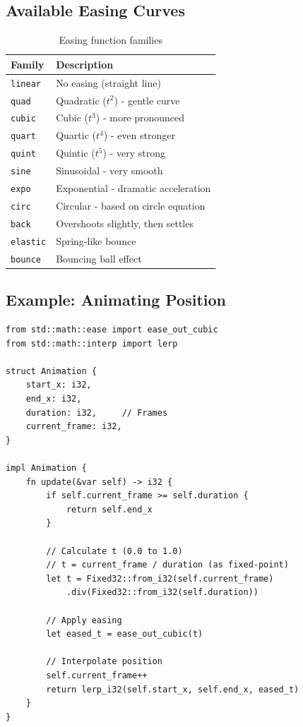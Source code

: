 \subsection{Available Easing Curves}

\begin{table}[h]
\centering
\begin{tabular}{lp{8cm}}
\textbf{Family} & \textbf{Description} \\
\hline
\texttt{linear} & No easing (straight line) \\
\texttt{quad} & Quadratic ($t^2$) - gentle curve \\
\texttt{cubic} & Cubic ($t^3$) - more pronounced \\
\texttt{quart} & Quartic ($t^4$) - even stronger \\
\texttt{quint} & Quintic ($t^5$) - very strong \\
\texttt{sine} & Sinusoidal - very smooth \\
\texttt{expo} & Exponential - dramatic acceleration \\
\texttt{circ} & Circular - based on circle equation \\
\texttt{back} & Overshoots slightly, then settles \\
\texttt{elastic} & Spring-like bounce \\
\texttt{bounce} & Bouncing ball effect \\
\end{tabular}
\caption{Easing function families}
\end{table}

\subsection{Example: Animating Position}

\begin{lstlisting}
from std::math::ease import ease_out_cubic
from std::math::interp import lerp

struct Animation {
    start_x: i32,
    end_x: i32,
    duration: i32,     // Frames
    current_frame: i32,
}

impl Animation {
    fn update(&var self) -> i32 {
        if self.current_frame >= self.duration {
            return self.end_x
        }

        // Calculate t (0.0 to 1.0)
        // t = current_frame / duration (as fixed-point)
        let t = Fixed32::from_i32(self.current_frame)
            .div(Fixed32::from_i32(self.duration))

        // Apply easing
        let eased_t = ease_out_cubic(t)

        // Interpolate position
        self.current_frame++
        return lerp_i32(self.start_x, self.end_x, eased_t)
    }
}
\end{lstlisting}

